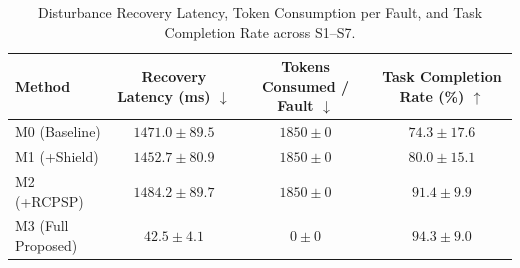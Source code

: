 \begin{table}[t]
\centering
\caption{Disturbance Recovery Latency, Token Consumption per Fault, and Task Completion Rate across S1--S7.}
\label{tab:disturbance_recovery}
\begin{tabular}{lccc}
\toprule
\textbf{Method} & \textbf{Recovery Latency (ms)} $\downarrow$ & \textbf{Tokens Consumed / Fault} $\downarrow$ & \textbf{Task Completion Rate (\%)} $\uparrow$ \\
\midrule
M0 (Baseline) & $1471.0 \pm 89.5$ & $1850 \pm 0$ & $74.3 \pm 17.6$ \\
M1 (+Shield) & $1452.7 \pm 80.9$ & $1850 \pm 0$ & $80.0 \pm 15.1$ \\
M2 (+RCPSP) & $1484.2 \pm 89.7$ & $1850 \pm 0$ & $91.4 \pm 9.9$ \\
M3 (Full Proposed) & $42.5 \pm 4.1$ & $0 \pm 0$ & $94.3 \pm 9.0$ \\
\bottomrule
\end{tabular}
\end{table}
